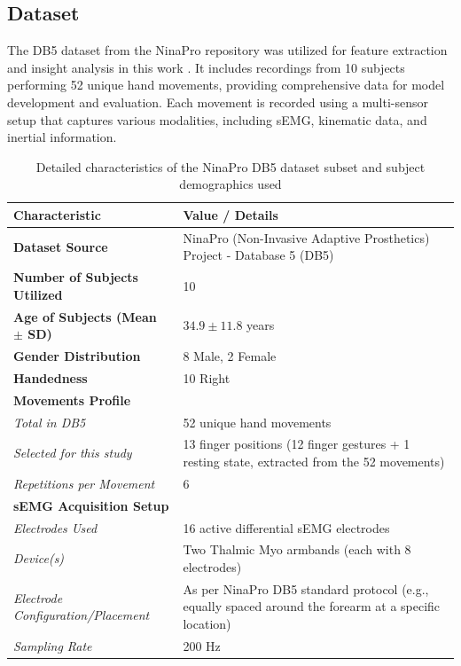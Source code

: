 \documentclass[preprint,12pt]{elsarticle}
\begin{document}
\subsection{Dataset}

The DB5 dataset from the NinaPro repository was utilized for feature extraction and insight analysis in this work \cite{19}. It includes recordings from 10 subjects performing 52 unique hand movements, providing comprehensive data for model development and evaluation. Each movement is recorded using a multi-sensor setup that captures various modalities, including sEMG, kinematic data, and inertial information. 

\begin{table}[!htbp]
\centering
\caption{Detailed characteristics of the NinaPro DB5 dataset subset and subject demographics used}

\label{tab:dataset_subject_details}
\begin{tabular}{L{5cm} L{7cm}} 
\toprule
\textbf{Characteristic} & \textbf{Value / Details} \\
\midrule
\textbf{Dataset Source} & NinaPro (Non-Invasive Adaptive Prosthetics) Project - Database 5 (DB5) \\
\addlinespace
\textbf{Number of Subjects Utilized} & 10 \\
\addlinespace
\textbf{Age of Subjects (Mean $\pm$ SD)} & $34.9 \pm 11.8$ years \\
\addlinespace
\textbf{Gender Distribution} & 8 Male, 2 Female  \\
\addlinespace
\textbf{Handedness} & 10 Right \\
\addlinespace
\textbf{Movements Profile} & \\
\textit{Total in DB5} & 52 unique hand movements \\
\textit{Selected for this study} & 13 finger positions (12 finger gestures + 1 resting state, extracted from the 52 movements) \\
\textit{Repetitions per Movement} & 6  \\
\addlinespace
\textbf{sEMG Acquisition Setup} & \\
\textit{Electrodes Used} & 16 active differential sEMG electrodes \\
\textit{Device(s)} & Two Thalmic Myo armbands (each with 8 electrodes) \\
\textit{Electrode Configuration/Placement} & As per NinaPro DB5 standard protocol (e.g., equally spaced around the forearm at a specific location) \\
\textit{Sampling Rate} & 200 Hz  \\
\bottomrule
\end{tabular}
\vspace{2mm}
\end{table}
\end{document}
